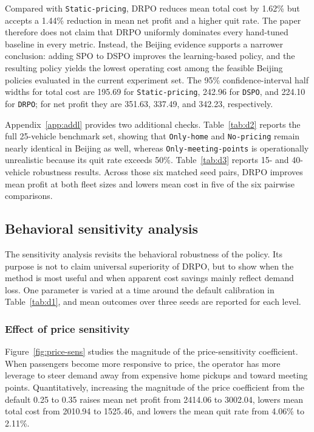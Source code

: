\documentclass[preprint,12pt,authoryear]{elsarticle}
\begin{document}
Compared with \texttt{Static-pricing}, DRPO reduces mean total cost by 1.62\% but accepts a 1.44\% reduction in mean net profit and a higher quit rate. The paper therefore does not claim that DRPO uniformly dominates every hand-tuned baseline in every metric. Instead, the Beijing evidence supports a narrower conclusion: adding SPO to DSPO improves the learning-based policy, and the resulting policy yields the lowest operating cost among the feasible Beijing policies evaluated in the current experiment set. The 95\% confidence-interval half widths for total cost are 195.69 for \texttt{Static-pricing}, 242.96 for \texttt{DSPO}, and 224.10 for \texttt{DRPO}; for net profit they are 351.63, 337.49, and 342.23, respectively.

Appendix~\ref{app:addl} provides two additional checks. Table~\ref{tab:d2} reports the full 25-vehicle benchmark set, showing that \texttt{Only-home} and \texttt{No-pricing} remain nearly identical in Beijing as well, whereas \texttt{Only-meeting-points} is operationally unrealistic because its quit rate exceeds 50\%. Table~\ref{tab:d3} reports 15- and 40-vehicle robustness results. Across those six matched seed pairs, DRPO improves mean profit at both fleet sizes and lowers mean cost in five of the six pairwise comparisons.

\subsection{Behavioral sensitivity analysis}

The sensitivity analysis revisits the behavioral robustness of the policy. Its purpose is not to claim universal superiority of DRPO, but to show when the method is most useful and when apparent cost savings mainly reflect demand loss. One parameter is varied at a time around the default calibration in Table~\ref{tab:d1}, and mean outcomes over three seeds are reported for each level.

\subsubsection{Effect of price sensitivity}

Figure~\ref{fig:price-sens} studies the magnitude of the price-sensitivity coefficient. When passengers become more responsive to price, the operator has more leverage to steer demand away from expensive home pickups and toward meeting points. Quantitatively, increasing the magnitude of the price coefficient from the default 0.25 to 0.35 raises mean net profit from 2414.06 to 3002.04, lowers mean total cost from 2010.94 to 1525.46, and lowers the mean quit rate from 4.06\% to 2.11\%.
\end{document}

